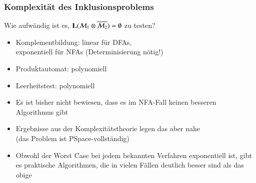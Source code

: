 \documentclass[aspectratio=1610,onlymath]{beamer}
\begin{document}
\begin{frame}\frametitle{Komplexität des Inklusionsproblems}

Wie aufwändig ist es, $\textbf{\textcolor{black}{L}}(\mathcal{M}_1\otimes\overline{\mathcal{M}_2})=\emptyset$ zu testen?%
\begin{itemize}
\item Komplementbildung: linear für DFAs,\\exponentiell für NFAs (Determinisierung nötig!)
\item Produktautomat: polynomiell
\item Leerheitstest: polynomiell
\end{itemize}\pause

\pause
% 
% 
% 

\begin{itemize}
\item Es ist bisher nicht bewiesen, dass es im NFA-Fall keinen besseren Algorithmus gibt
\item Ergebnisse aus der Komplexitätstheorie legen das aber nahe\\[-1ex]
{\tiny \textcolor{devilscss}{(das Problem ist PSpace-vollständig)}}
\item Obwohl der Worst Case bei jedem bekannten Verfahren exponentiell ist, gibt es praktische Algorithmen, die in vielen Fällen deutlich besser sind als das obige
\end{itemize}

\end{frame}
\end{document}
